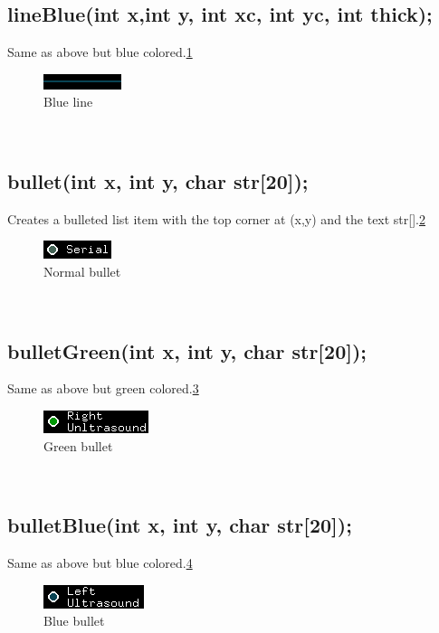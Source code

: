 \documentclass{article}
\begin{document}
\subsection{lineBlue(int x,int y, int xc, int yc, int thick);}
Same as above but blue colored.\ref{lineblue}\\
\begin{figure}[htp]
  \begin{center}
\includegraphics[]{lineblue}
  \end{center}
  \caption{Blue line}
\label{lineblue}
\end{figure}\\

\subsection{bullet(int x, int y, char str[20]);}
Creates a bulleted list item with the top corner at (x,y) and the text str[].\ref{bullet}\\
\begin{figure}[htp]
  \begin{center}
\includegraphics[]{bullet}
  \end{center}
  \caption{Normal bullet}
\label{bullet}
\end{figure}\\

\subsection{bulletGreen(int x, int y, char str[20]);}
Same as above but green colored.\ref{bulletgreen}\\
\begin{figure}[htp]
  \begin{center}
\includegraphics[]{bulletgreen}
  \end{center}
  \caption{Green bullet}
\label{bulletgreen}
\end{figure}\\

\subsection{bulletBlue(int x, int y, char str[20]);}
Same as above but blue colored.\ref{bulletblue}\\
\begin{figure}[htp]
  \begin{center}
\includegraphics[]{bulletblue}
  \end{center}
  \caption{Blue bullet}
\label{bulletblue}
\end{figure}\\
\end{document}
